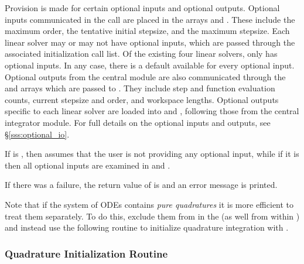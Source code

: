 Provision is made for certain optional inputs and optional outputs.
Optional inputs communicated in the  call are placed
in the arrays  and .  These include the maximum
order, the tentative initial stepsize, and the maximum stepsize.  Each
{\cvodes} linear solver may or may not have optional inputs, which are
passed through the associated initialization call list.  Of the existing four
linear solvers, only {\cvspgmr} has optional inputs.  In any case, there
is a default available for every optional input.  Optional outputs
from the central {\cvodes} module are also communicated through the
 and  arrays which are passed to .
They include step and function evaluation counts, current stepsize and
order, and workspace lengths.  Optional outputs
specific to each linear solver are loaded into  and
, following those from the central integrator module.
For full details on the optional inputs and outputs, see
\S\ref{sss:optional_io}.

If  is , then {\cvodes} assumes that the user is not providing
any optional input, while if it is  then all optional inputs 
are examined in  and . 

If there was a failure, the return value of  is  and
an error message is printed.

Note that if the system of ODEs contains {\em pure quadratures} it is more efficient
to treat them separately. To do this, exclude them from  in the 
 (as well from within ) and instead use the following 
routine to initialize quadrature integration with {\cvodes}.

\subsubsection{Quadrature Initialization Routine}\label{sss:cvodequadmalloc}

